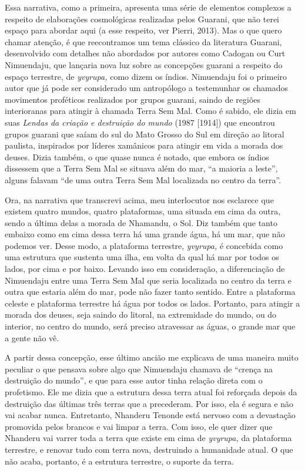 Essa narrativa, como a primeira, apresenta uma série de elementos
complexos a respeito de elaborações cosmológicas realizadas pelos
Guarani, que não terei espaço para abordar aqui (a esse respeito, ver
Pierri, 2013). Mas o que quero chamar atenção, é que reecontramos um
tema clássico da literatura Guarani, desenvolvido com detalhes não
abordados por autores como Cadogan ou Curt Nimuendaju, que lançaria nova
luz sobre as concepções guarani a respeito do espaço terrestre, de
\emph{yvyrupa,} como dizem os índios. Nimuendaju foi o primeiro autor
que já pode ser considerado um antropólogo a testemunhar os chamados
movimentos proféticos realizados por grupos guarani, saindo de regiões
interioranas para atingir à chamada Terra Sem Mal. Como é sabido, ele
dizia em suas \emph{Lendas da criação e destruição do mundo} (1987
{[}1914{]}) que encontrou grupos guarani que saíam do sul do Mato Grosso
do Sul em direção ao litoral paulista, inspirados por líderes xamânicos
para atingir em vida a morada dos deuses. Dizia também, o que quase
nunca é notado, que embora os índios dissessem que a Terra Sem Mal se
situava além do mar, ``a maioria a leste'', alguns falavam ``de uma
outra Terra Sem Mal localizada no centro da terra''.

Ora, na narrativa que transcrevi acima, meu interlocutor nos esclarece
que existem quatro mundos, quatro plataformas, uma situada em cima da
outra, sendo a última delas a morada de Nhamandu, o Sol. Diz também que
tanto embaixo como em cima dessa terra há uma grande água, há um mar,
que não podemos ver. Desse modo, a plataforma terrestre, \emph{yvyrupa,}
é concebida como uma estrutura que sustenta uma ilha, em volta da qual
há mar por todos os lados, por cima e por baixo. Levando isso em
consideração, a diferenciação de Nimuendaju entre uma Terra Sem Mal que
seria localizada no centro da terra e outra que estaria além do mar,
pode não fazer tanto sentido. Entre a plataforma celeste e plataforma
terrestre há água por todos os lados. Portanto, para atingir a morada
dos deuses, seja saindo do litoral, na extremidade do mundo, ou do
interior, no centro do mundo, será preciso atravessar as águas, o grande
mar que a gente não vê.

A partir dessa concepção, esse último ancião me explicava de uma maneira
muito peculiar o que pensava sobre algo que Nimuendaju chamava de
``crença na destruição do mundo'', e que para esse autor tinha relação
direta com o profetismo. Ele me dizia que a estrutura dessa terra atual
foi reforçada depois da destruição das últimas três terras que a
precederam. Por isso, ela é segura e não vai acabar nunca. Entretanto,
Nhanderu Tenonde está nervoso com a devastação promovida pelos brancos e
vai limpar a terra. Com isso, ele quer dizer que Nhanderu vai varrer
toda a terra que existe em cima de \emph{yvyrupa,} da plataforma
terrestre, e renovar tudo com terra nova, destruindo a humanidade atual.
O que não acaba, portanto, é a estrutura terrestre, o suporte da terra.

